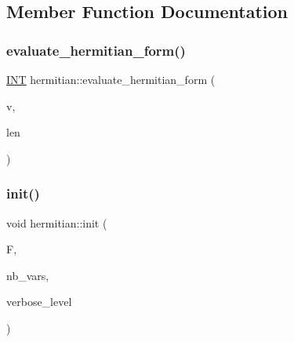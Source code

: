 \subsection{Member Function Documentation}
\mbox{\label{classhermitian_a8f44e894b4941a4bac5b985c69ba81e5}} 
\subsubsection{\texorpdfstring{evaluate\+\_\+hermitian\+\_\+form()}{evaluate\_hermitian\_form()}}
{\footnotesize\ttfamily \mbox{\hyperlink{galois_8h_a09fddde158a3a20bd2dcadb609de11dc}{I\+NT}} hermitian\+::evaluate\+\_\+hermitian\+\_\+form (\begin{DoxyParamCaption}\item[{\mbox{\hyperlink{galois_8h_a09fddde158a3a20bd2dcadb609de11dc}{I\+NT}} $\ast$}]{v,  }\item[{\mbox{\hyperlink{galois_8h_a09fddde158a3a20bd2dcadb609de11dc}{I\+NT}}}]{len }\end{DoxyParamCaption})}

\mbox{\label{classhermitian_a02a6643f6d2bcca20d3bf287d8745b35}} 
\subsubsection{\texorpdfstring{init()}{init()}}
{\footnotesize\ttfamily void hermitian\+::init (\begin{DoxyParamCaption}\item[{\mbox{\hyperlink{classfinite__field}{finite\+\_\+field}} $\ast$}]{F,  }\item[{\mbox{\hyperlink{galois_8h_a09fddde158a3a20bd2dcadb609de11dc}{I\+NT}}}]{nb\+\_\+vars,  }\item[{\mbox{\hyperlink{galois_8h_a09fddde158a3a20bd2dcadb609de11dc}{I\+NT}}}]{verbose\+\_\+level }\end{DoxyParamCaption})}

\mbox{\label{classhermitian_aa3df8a3bcdea19eaed6a63ec15c79e54}} 

